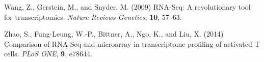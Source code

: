 \documentclass{bioinfo}
\begin{document}
\begin{thebibliography}{}
Wang, Z., Gerstein, M., and Snyder, M. (2009) RNA-Seq: A revolutionary tool for transcriptomics. {\it Nature Reviews Genetics}, {\bf 10}, 57--63.

Zhao, S., Fung-Leung, W.-P., Bittner, A., Ngo, K., and Liu, X. (2014) Comparison of RNA-Seq and microarray in transcriptome profiling of activated T cells. {\it PLoS ONE}, {\bf 9}, e78644.

\end{thebibliography}
\end{document}
